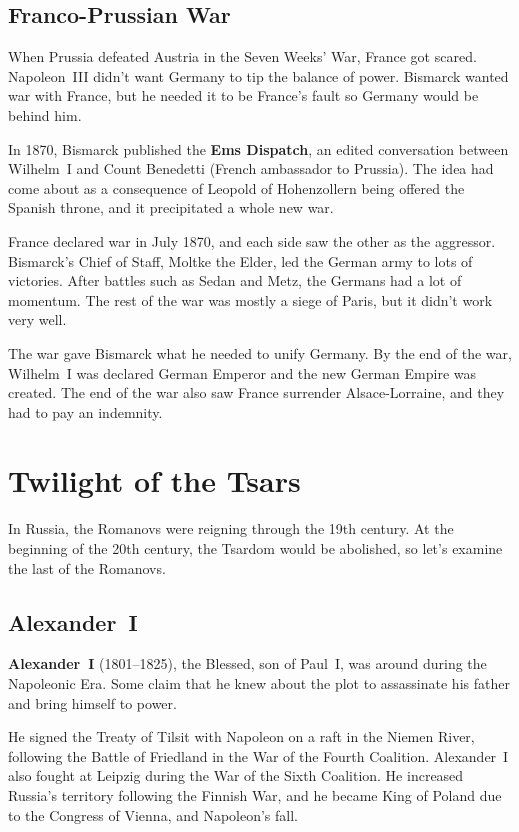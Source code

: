 \subsection*{Franco-Prussian War}

When Prussia defeated Austria in the Seven Weeks' War, France got scared.
Napoleon~III didn't want Germany to tip the balance of power.
Bismarck wanted war with France, but he needed it to be France's fault so Germany would be behind him.

In 1870, Bismarck published the \textbf{Ems Dispatch},
an edited conversation between Wilhelm~I and Count Benedetti (French ambassador to Prussia).
The idea had come about as a consequence of Leopold of Hohenzollern being offered the Spanish throne,
and it precipitated a whole new war.

France declared war in July 1870, and each side saw the other as the aggressor.
Bismarck's Chief of Staff, Moltke the Elder, led the German army to lots of victories.
After battles such as Sedan and Metz, the Germans had a lot of momentum.
The rest of the war was mostly a siege of Paris, but it didn't work very well.

The war gave Bismarck what he needed to unify Germany.
By the end of the war, Wilhelm~I was declared German Emperor and the new German Empire was created.
The end of the war also saw France surrender Alsace-Lorraine, and they had to pay an indemnity.

\section{Twilight of the Tsars}

In Russia, the Romanovs were reigning through the 19th century.
At the beginning of the 20th century, the Tsardom would be abolished, so let's examine the last of the Romanovs.

\subsection*{Alexander~I}

\textbf{Alexander~I} (1801--1825), the Blessed, son of Paul~I, was around during the Napoleonic Era.
Some claim that he knew about the plot to assassinate his father and bring himself to power.

He signed the Treaty of Tilsit with Napoleon on a raft in the Niemen River,
following the Battle of Friedland in the War of the Fourth Coalition.
Alexander~I also fought at Leipzig during the War of the Sixth Coalition.
He increased Russia's territory following the Finnish War,
and he became King of Poland due to the Congress of Vienna, and Napoleon's fall.


